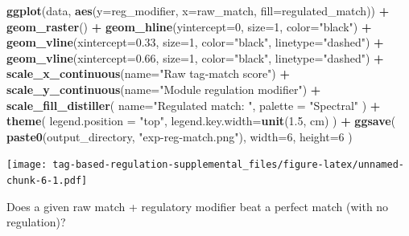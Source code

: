 \documentclass[
]{book}
\newenvironment{Shaded}{\begin{snugshade}}{\end{snugshade}}
\newcommand{\DataTypeTok}[1]{\textcolor[rgb]{0.13,0.29,0.53}{#1}}
\newcommand{\DecValTok}[1]{\textcolor[rgb]{0.00,0.00,0.81}{#1}}
\newcommand{\FloatTok}[1]{\textcolor[rgb]{0.00,0.00,0.81}{#1}}
\newcommand{\KeywordTok}[1]{\textcolor[rgb]{0.13,0.29,0.53}{\textbf{#1}}}
\newcommand{\NormalTok}[1]{#1}
\newcommand{\OperatorTok}[1]{\textcolor[rgb]{0.81,0.36,0.00}{\textbf{#1}}}
\newcommand{\StringTok}[1]{\textcolor[rgb]{0.31,0.60,0.02}{#1}}
\begin{document}
\begin{Shaded}
\begin{Highlighting}[]
\KeywordTok{ggplot}\NormalTok{(data, }\KeywordTok{aes}\NormalTok{(}\DataTypeTok{y=}\NormalTok{reg\_modifier, }\DataTypeTok{x=}\NormalTok{raw\_match, }\DataTypeTok{fill=}\NormalTok{regulated\_match)) }\OperatorTok{+}
\StringTok{  }\KeywordTok{geom\_raster}\NormalTok{() }\OperatorTok{+}
\StringTok{  }\KeywordTok{geom\_hline}\NormalTok{(}\DataTypeTok{yintercept=}\DecValTok{0}\NormalTok{, }\DataTypeTok{size=}\DecValTok{1}\NormalTok{, }\DataTypeTok{color=}\StringTok{"black"}\NormalTok{) }\OperatorTok{+}
\StringTok{  }\KeywordTok{geom\_vline}\NormalTok{(}\DataTypeTok{xintercept=}\FloatTok{0.33}\NormalTok{, }\DataTypeTok{size=}\DecValTok{1}\NormalTok{, }\DataTypeTok{color=}\StringTok{"black"}\NormalTok{, }\DataTypeTok{linetype=}\StringTok{"dashed"}\NormalTok{) }\OperatorTok{+}
\StringTok{  }\KeywordTok{geom\_vline}\NormalTok{(}\DataTypeTok{xintercept=}\FloatTok{0.66}\NormalTok{, }\DataTypeTok{size=}\DecValTok{1}\NormalTok{, }\DataTypeTok{color=}\StringTok{"black"}\NormalTok{, }\DataTypeTok{linetype=}\StringTok{"dashed"}\NormalTok{) }\OperatorTok{+}
\StringTok{  }\KeywordTok{scale\_x\_continuous}\NormalTok{(}\DataTypeTok{name=}\StringTok{"Raw tag{-}match score"}\NormalTok{) }\OperatorTok{+}
\StringTok{  }\KeywordTok{scale\_y\_continuous}\NormalTok{(}\DataTypeTok{name=}\StringTok{"Module regulation modifier"}\NormalTok{) }\OperatorTok{+}
\StringTok{  }\KeywordTok{scale\_fill\_distiller}\NormalTok{(}
    \DataTypeTok{name=}\StringTok{"Regulated match:  "}\NormalTok{,}
    \DataTypeTok{palette =} \StringTok{"Spectral"}
\NormalTok{  ) }\OperatorTok{+}
\StringTok{  }\KeywordTok{theme}\NormalTok{(}
    \DataTypeTok{legend.position =} \StringTok{"top"}\NormalTok{,}
    \DataTypeTok{legend.key.width=}\KeywordTok{unit}\NormalTok{(}\FloatTok{1.5}\NormalTok{, }\StringTok{\textquotesingle{}cm\textquotesingle{}}\NormalTok{)}
\NormalTok{  ) }\OperatorTok{+}
\StringTok{  }\KeywordTok{ggsave}\NormalTok{(}
    \KeywordTok{paste0}\NormalTok{(output\_directory, }\StringTok{"exp{-}reg{-}match.png"}\NormalTok{),}
    \DataTypeTok{width=}\DecValTok{6}\NormalTok{,}
    \DataTypeTok{height=}\DecValTok{6}
\NormalTok{  )}
\end{Highlighting}
\end{Shaded}

\texttt{[image: tag-based-regulation-supplemental\_files/figure-latex/unnamed-chunk-6-1.pdf]}

Does a given raw match + regulatory modifier beat a perfect match (with no regulation)?
\end{document}
